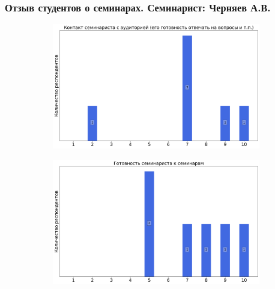         
    \subsubsection{Отзыв студентов о семинарах. Семинарист: Черняев А.В.}
        \begin{figure}[H]
            \centering
            \begin{subfigure}[b]{0.45\textwidth}
                \centering
                \includegraphics[width=\textwidth]{images/2 course/Кратные интегралы и теория поля/seminarists-marks-Черняев А.В.-0.png}
            \end{subfigure}
            \begin{subfigure}[b]{0.45\textwidth}
                \centering
                \includegraphics[width=\textwidth]{images/2 course/Кратные интегралы и теория поля/seminarists-marks-Черняев А.В.-1.png}
            \end{subfigure}
            \begin{subfigure}[b]{0.45\textwidth}
                \centering

\end{subfigure}
\end{figure}

